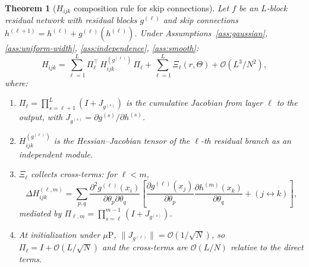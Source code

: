\documentclass[11pt]{article}
\newtheorem{theorem}{Theorem}[section]
\theoremstyle{definition}
\newcommand{\cO}{\mathcal{O}}
\newcommand{\muP}{\mu\text{P}}
\newcommand{\norm}[1]{\lVert #1 \rVert}
\newcommand{\pp}{\partial}
\renewcommand{\Theta}{\varTheta}
\begin{document}
\begin{theorem}[$H_{ijk}$ composition rule for skip connections]
\label{thm:H-skip}
Let $f$ be an $L$-block residual network with residual blocks $g^{(\ell)}$ and skip connections $h^{(\ell+1)} = h^{(\ell)} + g^{(\ell)}(h^{(\ell)})$. Under Assumptions~\ref{ass:gaussian}, \ref{ass:uniform-width}, \ref{ass:independence}, \ref{ass:smooth}:
\begin{equation}
\label{eq:H-skip}
H_{ijk} = \sum_{\ell=1}^L \Pi_\ell^\top\, H_{ijk}^{(g^{(\ell)})}\, \Pi_\ell + \sum_{\ell=1}^L \Xi_\ell(r, \Theta) + \cO(L^3/N^2),
\end{equation}
where:
\begin{enumerate}[label=(\roman*)]
\item $\Pi_\ell = \prod_{s=\ell+1}^L (I + J_{g^{(s)}})$ is the cumulative Jacobian from layer $\ell$ to the output, with $J_{g^{(s)}} = \pp g^{(s)}/\pp h^{(s)}$.
\item $H_{ijk}^{(g^{(\ell)})}$ is the Hessian--Jacobian tensor of the $\ell$-th residual branch as an independent module.
\item $\Xi_\ell$ collects cross-terms: for $\ell < m$,
\begin{equation}
\Delta H_{ijk}^{(\ell,m)} = \sum_{p,q} \frac{\pp^2 g^{(\ell)}(x_i)}{\pp\theta_p \pp\theta_q}\left[\frac{\pp g^{(\ell)}(x_j)}{\pp\theta_p}\frac{\pp h^{(m)}(x_k)}{\pp\theta_q} + (j \leftrightarrow k)\right],
\end{equation}
mediated by $\Pi_{\ell,m} = \prod_{s=\ell}^{m-1}(I + J_{g^{(s)}})$.
\item At initialization under $\muP$, $\norm{J_{g^{(\ell)}}} = \cO(1/\sqrt{N})$, so $\Pi_\ell = I + \cO(L/\sqrt{N})$ and the cross-terms are $\cO(L/N)$ relative to the direct terms.
\end{enumerate}
\end{theorem}
\end{document}
